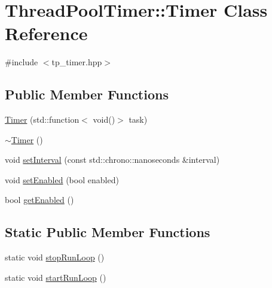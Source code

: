 \hypertarget{classThreadPoolTimer_1_1Timer}{\section{Thread\-Pool\-Timer\-:\-:Timer Class Reference}
\label{classThreadPoolTimer_1_1Timer}
}


{\ttfamily \#include $<$tp\-\_\-timer.\-hpp$>$}

\subsection*{Public Member Functions}
\begin{DoxyCompactItemize}
\item 
\hyperlink{classThreadPoolTimer_1_1Timer_a51953e9bed22f2b8bfef033a3efdc573}{Timer} (std\-::function$<$ void()$>$ task)
\item 
\hyperlink{classThreadPoolTimer_1_1Timer_a123cb275809a87d0c01d2e9894298a40}{$\sim$\-Timer} ()
\item 
void \hyperlink{classThreadPoolTimer_1_1Timer_a9112e65788529e3230b22dcace7421f7}{set\-Interval} (const std\-::chrono\-::nanoseconds \&interval)
\item 
void \hyperlink{classThreadPoolTimer_1_1Timer_aed13ba283b0cd1e83697bc0d553b37d9}{set\-Enabled} (bool enabled)
\item 
bool \hyperlink{classThreadPoolTimer_1_1Timer_ab2543b0d593e885335786d5b2ed81302}{get\-Enabled} ()
\end{DoxyCompactItemize}
\subsection*{Static Public Member Functions}
\begin{DoxyCompactItemize}
\item 
static void \hyperlink{classThreadPoolTimer_1_1Timer_afc1617ff337812f126f04ee425f48caa}{stop\-Run\-Loop} ()
\item 
static void \hyperlink{classThreadPoolTimer_1_1Timer_a5918ac320ad2bddfdbf72b0380392107}{start\-Run\-Loop} ()
\end{DoxyCompactItemize}



